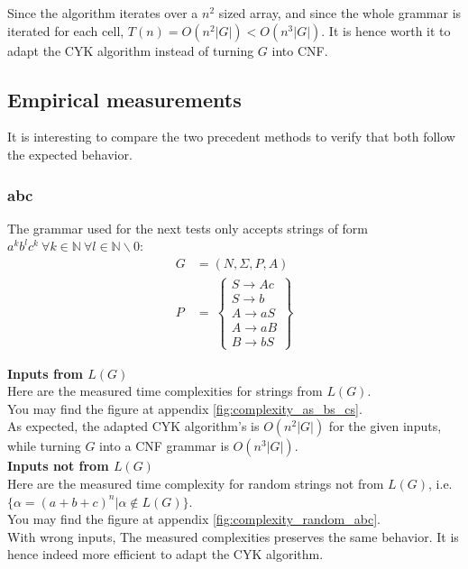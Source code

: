 \documentclass[twocolumn]{article}
\begin{document}
Since the algorithm iterates over a $n^2$ sized array, and since the whole grammar is iterated for each cell, $T(n)=O(n^2|G|)<O(n^3|G|)$. It is hence worth it to adapt the CYK algorithm instead of turning $G$ into CNF.

\subsection{Empirical measurements}
It is interesting to compare the two precedent methods to verify that both follow the expected behavior.

\subsubsection{abc}
The grammar used for the next tests only accepts strings of form $a^kb^lc^k\ \forall k\in \mathbb{N}\ \forall l\in\mathbb{N}\backslash 0$:\\
\begin{align*}
  G&=(N,\Sigma,P,A)\\
  P&=\
  \left\{ \begin{array}{l}
    S\rightarrow Ac\\
    S\rightarrow b\\
    A\rightarrow aS\\
    A\rightarrow aB\\
    B\rightarrow bS
  \end{array}\right\}
\end{align*}

\textbf{Inputs from $L(G)$}\\
Here are the measured time complexities for strings from $L(G)$.\\
You may find the figure at appendix \ref{fig:complexity_as_bs_cs}.
\\

As expected, the adapted CYK algorithm's is $O(n^2|G|)$ for the given inputs, while turning $G$ into a CNF grammar is $O(n^3|G|)$.
\\

\textbf{Inputs not from $L(G)$}\\
Here are the measured time complexity for random strings not from $L(G)$, i.e. $\{\alpha=(a+b+c)^n|\alpha\notin L(G)\}$.\\
You may find the figure at appendix \ref{fig:complexity_random_abc}.
\\

With wrong inputs, The measured complexities preserves the same behavior. It is hence indeed more efficient to adapt the CYK algorithm.
\end{document}
